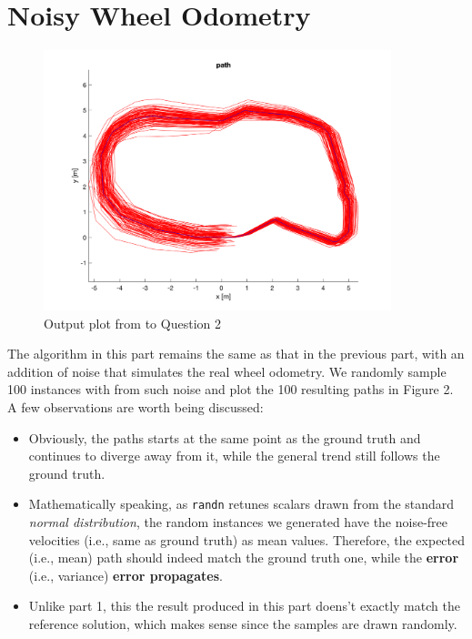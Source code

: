 \documentclass{article} %
\begin{document}
\section{Noisy Wheel Odometry} 
\begin{figure}[hbt]
  \centering
    \includegraphics[width=0.9\textwidth]{ass1_q2.png}
  \caption{Output plot from to Question 2}
\end{figure}

The algorithm in this part remains the same as that in the previous part, with an addition of noise that simulates the real wheel odometry. We randomly sample 100 instances with from such noise and plot the 100 resulting paths in Figure 2. A few observations are worth being discussed:
\begin{itemize}
    \item Obviously, the paths starts at the same point as the ground truth and continues to diverge away from it, while the general trend still follows the ground truth.
    \item Mathematically speaking, as \texttt{randn} retunes scalars drawn from the standard \textit{normal distribution}, the random instances we generated have the noise-free velocities (i.e., same as ground truth) as mean values. Therefore, the expected (i.e., mean) path should indeed match the ground truth one, while the \textbf{error} (i.e., variance) \textbf{error propagates}.
    \item Unlike part 1, this the result produced in this part doens't exactly match the reference solution, which makes sense since the samples are drawn randomly.
\end{itemize}

\end{document}
